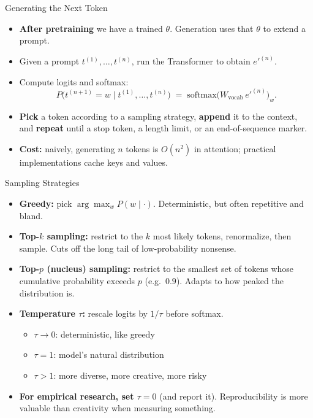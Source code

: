 \documentclass[10pt,english,aspectratio=169]{beamer}
\begin{document}
\begin{frame}{Generating the Next Token}
\begin{itemize}
\item \textbf{After pretraining} we have a trained $\theta$. Generation uses that $\theta$ to extend a prompt.

\medskip
\item Given a prompt $t^{(1)}, \ldots, t^{(n)}$, run the Transformer to obtain $e'^{(n)}$.

\medskip
\item Compute logits and softmax:
\[
   P\bigl(t^{(n+1)} = w \mid t^{(1)}, \ldots, t^{(n)}\bigr) \;=\; \mathrm{softmax}\bigl(W_{\text{vocab}}\, e'^{(n)}\bigr)_{w}.
\]

\medskip
\item \textbf{Pick} a token according to a sampling strategy, \textbf{append} it to the context, and \textbf{repeat} until a stop token, a length limit, or an end-of-sequence marker.

\medskip
\item \textbf{Cost:} naively, generating $n$ tokens is $O(n^{2})$ in attention; practical implementations cache keys and values.
\end{itemize}
\end{frame}

\begin{frame}{Sampling Strategies}
\begin{itemize}
\item \textbf{Greedy:} pick $\arg\max_w P(w \mid \cdot)$. Deterministic, but often repetitive and bland.

\medskip
\item \textbf{Top-$k$ sampling:} restrict to the $k$ most likely tokens, renormalize, then sample. Cuts off the long tail of low-probability nonsense.

\medskip
\item \textbf{Top-$p$ (nucleus) sampling:} restrict to the smallest set of tokens whose cumulative probability exceeds $p$ (e.g.\ $0.9$). Adapts to how peaked the distribution is.

\medskip
\item \textbf{Temperature $\tau$:} rescale logits by $1/\tau$ before softmax.
\begin{itemize}
    \item $\tau \rightarrow 0$: deterministic, like greedy
    \item $\tau = 1$: model's natural distribution
    \item $\tau > 1$: more diverse, more creative, more risky
\end{itemize}

\medskip
\item \textbf{For empirical research, set $\tau = 0$} (and report it). Reproducibility is more valuable than creativity when measuring something.
\end{itemize}
\end{frame}
\end{document}
